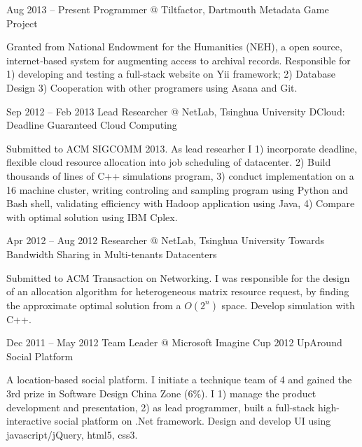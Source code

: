 \documentclass{tccv}
\begin{document}
\begin{eventlist}

\item{Aug 2013 -- Present}
     {Programmer @ Tiltfactor, Dartmouth}
     {Metadata Game Project}
     
     Granted from National Endowment for the Humanities (NEH), a open source, internet‐based system for augmenting access to archival records. Responsible for 1) developing and testing a full-stack website on Yii framework; 2) Database Design 3) Cooperation with other programers using Asana and Git. \newline
     
\item{Sep 2012 -- Feb 2013}
     {Lead Researcher @ NetLab, Tsinghua University}
     {DCloud: Deadline Guaranteed Cloud Computing}
     
     Submitted to ACM SIGCOMM 2013. As lead researher I 1) incorporate deadline, flexible cloud resource allocation into job scheduling of datacenter. 2) Build thousands of lines of C++ simulations program, 3) conduct implementation on a 16 machine cluster, writing controling and sampling program using Python and Bash shell, validating efficiency with Hadoop application using Java, 4) Compare with optimal solution using IBM Cplex. \newline
     
\item{Apr 2012 -- Aug 2012}
     {Researcher @ NetLab, Tsinghua University}
     {Towards Bandwidth Sharing in Multi-tenants Datacenters}
     
     Submitted to ACM Transaction on Networking. I was responsible for the design of an allocation algorithm for heterogeneous matrix resource request, by finding the approximate optimal solution from a $O(2^n)$ space. Develop simulation with C++. \newline
     
\item{Dec 2011 -- May 2012}
     {Team Leader @ Microsoft Imagine Cup 2012}
     {UpAround Social Platform}
     
     A location-based social platform. I initiate a technique team of 4 and gained the 3rd prize in Software Design China Zone (6\%). I 1) manage the product development and presentation, 2) as lead programmer, built a full-stack high-interactive social platform on .Net framework. Design and develop UI using javascript/jQuery, html5, css3. \newline
         

\end{eventlist}
\end{document}

